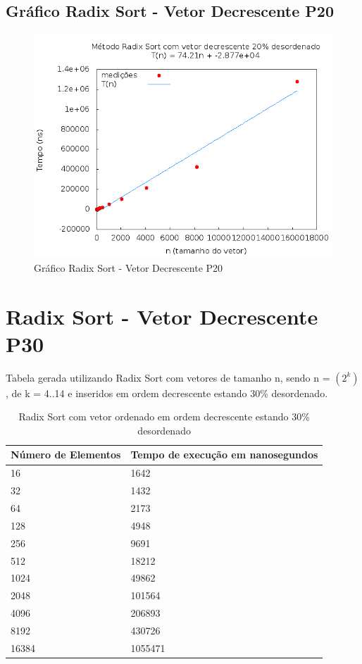 \documentclass[12pt,a4paper,twoside]{report}
\begin{document}
\subsection{Gráfico Radix Sort - Vetor Decrescente P20}
\begin{figure}[H]
    \centering
    \includegraphics[width=0.7\linewidth]{graficos/RadixSort/vIntDecrescenteP20/vIntDecrescenteP20.png}
  \caption{Gráfico Radix Sort - Vetor Decrescente P20}
\end{figure}

\section{Radix Sort - Vetor Decrescente P30}
Tabela gerada utilizando Radix Sort com vetores de tamanho n, sendo n = $(2^k)$, de k = 4..14 e inseridos em ordem decrescente estando 30\% desordenado.
\begin{table}[H]
\centering
\caption{Radix Sort com vetor ordenado em ordem decrescente estando 30\% desordenado}
\label{my-label}
\begin{tabular}{|l|l|}
\hline
\multicolumn{1}{|c|}{\textbf{Número de Elementos}} & \multicolumn{1}{c|}{\textbf{Tempo de execução em nanosegundos}} \\ \hline
16 & 1642 \\ \hline
32 & 1432 \\ \hline
64 & 2173 \\ \hline
128 & 4948 \\ \hline
256 & 9691 \\ \hline
512 & 18212 \\ \hline
1024 & 49862 \\ \hline
2048 & 101564 \\ \hline
4096 & 206893 \\ \hline
8192 & 430726 \\ \hline
16384 & 1055471 \\ \hline
\end{tabular}
\end{table}
\end{document}

